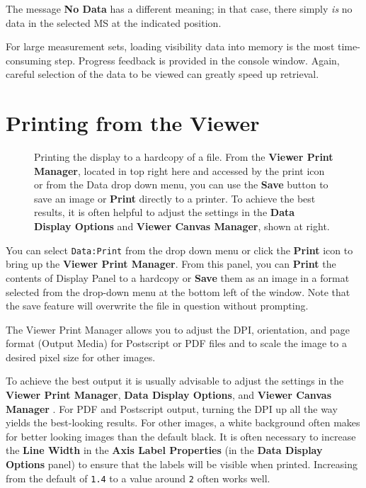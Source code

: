 The message {\bf No Data} has a different meaning; in that
case, there simply {\it is} no data in the selected MS at the
indicated position.

For large measurement sets, loading visibility data into memory is the
most time-consuming step.  Progress feedback is provided in the
console window.  Again, careful selection of the data to be viewed can
greatly speed up retrieval.

\section{Printing from the Viewer}
\label{section:display.print}

\begin{figure}[h!]
\begin{center}
\caption{\label{fig:viewer_print} Printing the display to a hardcopy
of a file. From the {\bf Viewer Print Manager}, located in top right here and
accessed by the print icon or from the Data drop down menu, 
you can use the {\bf Save} button to save an image or {\bf Print}
directly to a printer. To achieve the best results, it is often helpful to
adjust the settings in the {\bf Data Display Options} and {\bf Viewer Canvas Manager},
shown at right.} 
\hrulefill
\end{center}
\end{figure}

You can select {\tt Data:Print} from the drop down menu or click 
the {\bf Print} icon to bring up the {\bf Viewer Print Manager}. From this 
panel, you can {\bf Print} the contents of Display Panel to a hardcopy
or {\bf Save} them as an image in a format selected from the drop-down
menu at the bottom left of the window. Note that the save feature will
overwrite the file in question without prompting.

The Viewer Print Manager allows you to adjust the DPI, orientation,
and page format (Output Media) for Postscript or PDF files and to
scale the image to a desired pixel size for other images.

To achieve the best output it is usually advisable to adjust the settings
in the {\bf Viewer Print Manager}, {\bf Data Display Options}, 
and {\bf Viewer Canvas Manager} . For PDF and Postscript output, turning
the DPI up all the way yields the best-looking results. For other images,
a white background often makes for better looking images than the 
default black. It is often necessary to increase the {\bf Line Width}
in the {\bf Axis Label Properties} (in the {\bf Data Display Options} panel)
to ensure that the labels will be visible when printed.  Increasing from the default
of {\tt 1.4} to a value around {\tt 2} often works well.


